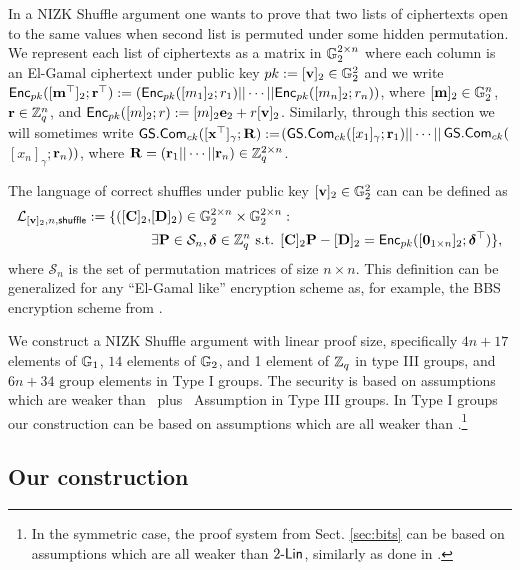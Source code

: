 In a NIZK Shuffle argument one wants to prove that two lists of ciphertexts open to the same values when second list is permuted under some hidden permutation.
We represent each list of ciphertexts as a matrix in $\mathbb{G}_2^{2\times n}$ where each column is an El-Gamal ciphertext under public key $pk:=[\mathbf{v}]_2\in\mathbb{G}^2_2$ and we write $\mathsf{Enc}_{pk}([\mathbf{m}^\top]_2;\mathbf{r}^\top):=(\mathsf{Enc}_{pk}([m_1]_2;r_1)||\cdots||\mathsf{Enc}_{pk}([m_n]_2;r_n))$, where $[\mathbf{m}]_2\in\mathbb{G}_2^n$, $\mathbf{r}\in\mathbb{Z}_q^n$, and $\mathsf{Enc}_{pk}([m]_2;r):=[m]_2\mathbf{e}_2+r[\mathbf{v}]_2$. Similarly, through this section we will sometimes write ${\mathsf{GS}}.\mathsf{Com}_{ck}([\mathbf{x}^\top]_\gamma;\mathbf{{R}}):=$\-$({\mathsf{GS}}.\mathsf{Com}_{ck}([x_1]_\gamma;\mathbf{r}_1)||\cdots||$${\mathsf{GS}}.\mathsf{Com}_{ck}($$[x_n]_\gamma;$$\mathbf{r}_n))$, where $\mathbf{{R}}=(\mathbf{r}_1||\cdots||\mathbf{r}_n)\in\mathbb{Z}_q^{2\times n}$.

The language of correct shuffles under public key $[\mathbf{v}]_2\in\mathbb{G}^2_2$ can can be defined as 
\begin{align*}
\mathcal{L}_{[\mathbf{v}]_2,n,\mathsf{shuffle}}:=\{([\mathbf{{C}}]_2,&[\mathbf{{D}}]_2)\in\mathbb{G}_2^{2\times n}\times \mathbb{G}_2^{2\times n} :\\
                                                         &\exists \mathbf{{P}}\in\mathcal{S}_n,{\boldsymbol \delta}\in\mathbb{Z}_q^n \text{ s.t. } {[\mathbf{{C}}]_2\mathbf{{P}}-[\mathbf{{D}}]_2 = \mathsf{Enc}_{pk}([\mathbf{0}_{1\times n}]_2;{\boldsymbol \delta}^\top)}\},
\end{align*}
where $\mathcal{S}_n$ is the set of permutation matrices of size $n\times n$. This definition can be generalized for any ``El-Gamal like'' encryption scheme as, for example, the BBS encryption scheme from \cite{C:BonBoySha04}.

We construct a NIZK Shuffle argument with linear proof size, specifically $4n+17$ elements of $\mathbb{G}_1$, $14$ elements of $\mathbb{G}_2$, and 1 element of $\mathbb{Z}_q$ in type III groups, and $6n+34$ group elements in Type I groups. The security is based on assumptions which are weaker than \sxdh~plus \SSDP~Assumption in  Type III groups. In Type I groups our construction can be based on assumptions which are all weaker than .\footnote{In the symmetric case, the proof system from Sect. \ref{sec:bits} can be based on assumptions which are all weaker than $2\mbox{-}\mathsf{Lin}$, similarly as done in \cite[Appendix C]{EPRINT:GonHevRaf15}.}
 
\subsection{Our construction}

